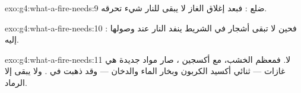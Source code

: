 \begin{solution}{exo:g4:what-a-fire-needs:9}
ضلع : فبعد إغلاق الغاز لا يبقى للنار شيء
تحرقه.
\end{solution}

\begin{solution}{exo:g4:what-a-fire-needs:10}
: فحين لا تبقى أشجار في الشريط ينفد  النار عند
وصولها إليه.
\end{solution}

\begin{solution}{exo:g4:what-a-fire-needs:11}
لا. فمعظم الخشب، مع أكسجين ، صار مواد جديدة هي غازات ---
ثنائي أكسيد الكربون وبخار الماء والدخان --- وقد ذهبت في . ولا
يبقى إلا الرماد.
\end{solution}

